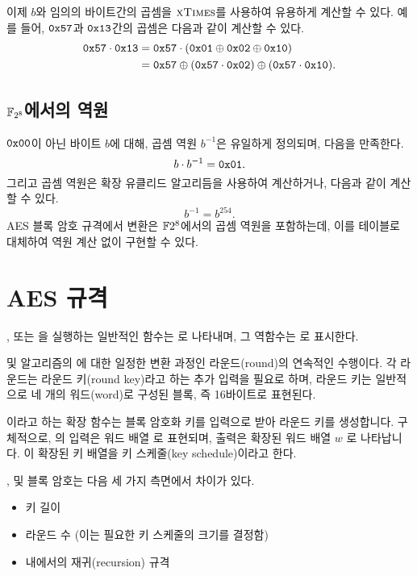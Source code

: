 \documentclass{article}
\begin{document}
이제 $b$와 임의의 바이트간의 곱셈을 $\textsc{xTimes}$를 사용하여 유용하게 계산할 수 있다. 예를 들어,
$\texttt{0x57}$과 $\texttt{0x13}$간의 곱셈은 다음과 같이 계산할 수 있다.
\begin{align}
    \texttt{0x57} \cdot \texttt{0x13} \notag
    &= \texttt{0x57} \cdot (\texttt{0x01} \oplus \texttt{0x02} \oplus \texttt{0x10}) \\ \notag
    &= \texttt{0x57} \oplus (\texttt{0x57} \cdot \texttt{0x02}) \oplus (\texttt{0x57} \cdot \texttt{0x10}). \notag
\end{align}

\subsection{$\mathbb{F}_{2^8}$에서의 역원}

$\texttt{0x00}$이 아닌 바이트 $b$에 대해, 곱셈 역원 $b^{-1}$은 유일하게 정의되며, 다음을 만족한다.
$$
    b \cdot b^{-1} = \texttt{0x01}.
$$
그리고 곱셈 역원은 확장 유클리드 알고리듬을 사용하여 계산하거나, 다음과 같이 계산할 수 있다.
$$
    b^{-1} = b^{254}.
$$
AES 블록 암호 규격에서 \sb 변환은 $\mathbb{F}{2^8}$에서의 곱셈 역원을 포함하는데, 이를
테이블로 대체하여 역원 계산 없이 구현할 수 있다.

\newpage
\section{AES 규격}

,  또는 을 실행하는 일반적인 함수는 \cipher 로
나타내며, 그 역함수는 \invcipher 로 표시한다.

\cipher 및 \invcipher 알고리즘의 \state 에 대한 일정한 변환 과정인
라운드(round)의 연속적인 수행이다. 각 라운드는 라운드 키(round key)라고 하는
추가 입력을 필요로 하며, 라운드 키는 일반적으로 네 개의 워드(word)로 구성된
블록, 즉 16바이트로 표현된다.

\KE 이라고 하는 확장 함수는 블록 암호화 키를 입력으로 받아 라운드 키를
생성합니다. 구체적으로, \KE 의 입력은 워드 배열 \key 로 표현되며,
출력은 확장된 워드 배열 $w$ 로 나타납니다. 이 확장된 키 배열을 키 스케줄(key
schedule)이라고 한다.

,  및   블록 암호는 다음 세 가지 측면에서 차이가 있다.
\begin{itemize}
    \item 키 길이
    \item 라운드 수 (이는 필요한 키 스케줄의 크기를 결정함)
    \item \KE 내에서의 재귀(recursion) 규격
\end{itemize}
\end{document}
